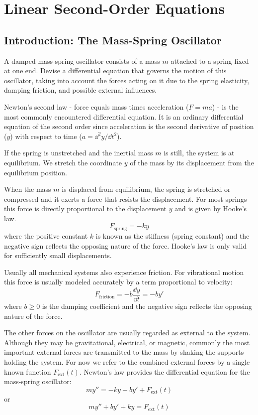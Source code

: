 \documentclass[../diffeq.tex]{subfiles}
\begin{document}
\chapter{Linear Second-Order Equations}
\section{Introduction: The Mass-Spring Oscillator}
A damped mass-spring oscillator consists of a mass $m$ attached to a spring fixed at one end. Devise a differential equation that governs the motion of this oscillator, taking into account 
the forces acting on it due to the spring elasticity, damping friction, and possible external influences.

Newton's second law - force equals mass times acceleration ($F=ma$) - is the most commonly encountered differential equation. It is an ordinary differential equation of the second order 
since acceleration is the second derivative of position ($y$) with respect to time ($a=\dd^2 y/\dd t^2$).

If the spring is unstretched and the inertial mass $m$ is still, the system is at equilibrium. We stretch the coordinate $y$ of the mass by its displacement from the equilibrium position.

When the mass $m$ is displaced from equilibrium, the spring is stretched or compressed and it exerts a force that resists the displacement. For most springs this force is directly proportional to the displacement $y$ 
and is given by Hooke's law.
\[ F_{\text{spring}}= -ky \]
where the positive constant $k$ is known as the stiffness (spring constant) and the negative sign reflects the opposing nature of the force. Hooke's law is only valid for sufficiently small displacements.

Usually all mechanical systems also experience friction. For vibrational motion this force is usually modeled accurately by a term proportional to velocity:
\[ F_{\text{friction}}=-b\frac{\dd y}{\dd t}=-by' \]
where $b\geq 0$ is the damping coefficient and the negative sign reflects the opposing nature of the force.

The other forces on the oscillator are usually regarded as external to the system. Although they may be gravitational, electrical, or magnetic, commonly the most important external forces are transmitted 
to the mass by shaking the supports holding the system. For now we refer to the combined external forces by a single known function $F_{\text{ext}}(t)$. Newton's law provides the differential equation for the mass-spring oscillator:
\[ my''=-ky-by'+F_{\text{ext}}(t)\] or \[ my''+by'+ky=F_{\text{ext}}(t) \]
\end{document}
